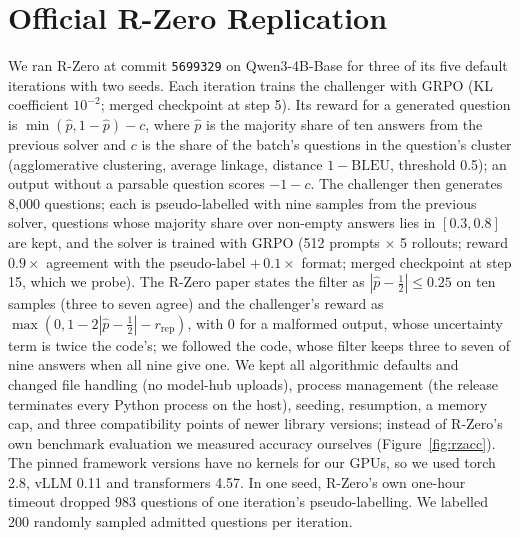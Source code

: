 \FloatBarrier
\section{Official R-Zero Replication}
\label{app:rzero}

We ran R-Zero at commit \texttt{5699329} on Qwen3-4B-Base for three of its five default iterations with two seeds. Each iteration trains the challenger with GRPO (KL coefficient $10^{-2}$; merged checkpoint at step 5). Its reward for a generated question is $\min(\hat p, 1{-}\hat p) - c$, where $\hat p$ is the majority share of ten answers from the previous solver and $c$ is the share of the batch's questions in the question's cluster (agglomerative clustering, average linkage, distance $1 - \mathrm{BLEU}$, threshold 0.5); an output without a parsable question scores $-1 - c$. The challenger then generates 8,000 questions; each is pseudo-labelled with nine samples from the previous solver, questions whose majority share over non-empty answers lies in $[0.3, 0.8]$ are kept, and the solver is trained with GRPO (512 prompts $\times$ 5 rollouts; reward $0.9\times$ agreement with the pseudo-label $+\,0.1\times$ format; merged checkpoint at step 15, which we probe). The R-Zero paper states the filter as $|\hat p - \frac12| \le 0.25$ on ten samples (three to seven agree) and the challenger's reward as $\max(0, 1 - 2|\hat p - \frac12| - r_{\mathrm{rep}})$, with 0 for a malformed output, whose uncertainty term is twice the code's; we followed the code, whose filter keeps three to seven of nine answers when all nine give one. We kept all algorithmic defaults and changed file handling (no model-hub uploads), process management (the release terminates every Python process on the host), seeding, resumption, a memory cap, and three compatibility points of newer library versions; instead of R-Zero's own benchmark evaluation we measured accuracy ourselves (Figure~\ref{fig:rzacc}). The pinned framework versions have no kernels for our GPUs, so we used torch 2.8, vLLM 0.11 and transformers 4.57. In one seed, R-Zero's own one-hour timeout dropped 983 questions of one iteration's pseudo-labelling. We labelled 200 randomly sampled admitted questions per iteration.

